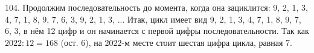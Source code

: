 104. Продолжим последовательность до момента, когда она зациклится:
9, 2, 1, 3, 4, 7, 1, 8, 9, 7, 6, 3, 9, 2, 1, 3, ... Итак, цикл имеет вид
9, 2, 1, 3, 4, 7, 1, 8, 9, 7, 6, 3, в нём 12 цифр и он начинается с первой цифры последовательности. Так как $2022:12=168$ (ост. 6), на 2022-м месте стоит шестая цифра цикла, равная 7.\\
